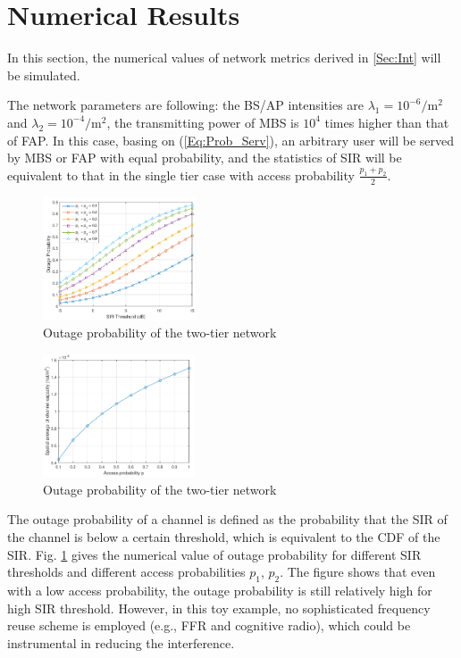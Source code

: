 \documentclass[a4paper,twocolumn]{IEEEtran}
\begin{document}
\section{Numerical Results}\label{Sec:Num}
In this section, the numerical values of network metrics derived in \ref{Sec:Int} will be simulated.

The network parameters are following: the BS/AP intensities are $\lambda_1 = 10^{-6} /\text{m}^2$ and $\lambda_2 = 10^{-4} /\text{m}^2$, the transmitting power of MBS is $10^4$ times higher than that of FAP. In this case, basing on (\ref{Eq:Prob_Serv}), an arbitrary user will be served by MBS or FAP with equal probability, and the statistics of SIR will be equivalent to that in the single tier case with access probability $\frac{p_1+p_2}{2}$.

\begin{figure}[t]
	\centering
	\includegraphics[width = 0.4\textwidth]{figure/Outage_cropped}
	
	\caption{Outage probability of the two-tier network}
	\label{Fig:Outage}
\end{figure}

\begin{figure}[t]
	\centering
	\includegraphics[width = 0.4\textwidth]{figure/Capacity_cropped}
	
	\caption{Outage probability of the two-tier network}
	\label{Fig:Capacity}
\end{figure}

The outage probability of a channel is defined as the probability that the SIR of the channel is below a certain threshold, which is equivalent to the CDF of the SIR. Fig. \ref{Fig:Outage} gives the numerical value of outage probability for different SIR thresholds and different access probabilities $p_1$, $p_2$. The figure shows that even with a low access probability, the outage probability is still relatively high for high SIR threshold. However, in this toy example, no sophisticated frequency reuse scheme is employed (e.g., FFR and cognitive radio), which could be instrumental in reducing the interference.
\end{document}
